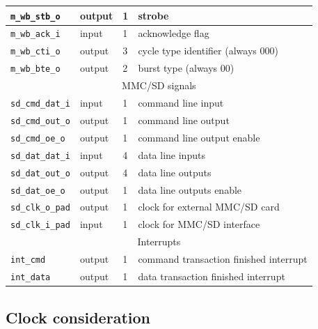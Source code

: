 \begin{table}
\begin{center}
\begin{tabular}{l|l|l|l}
                    \texttt{m\_wb\_stb\_o} & output & 1 & strobe \\ \hline
                    \texttt{m\_wb\_ack\_i} & input & 1 & acknowledge flag \\ \hline
                    \texttt{m\_wb\_cti\_o} & output & 3 & cycle type identifier (always 000) \\ \hline
                    \texttt{m\_wb\_bte\_o} & output & 2 & burst type (always 00) \\ \hline
                    \multicolumn{4}{c}{MMC/SD signals} \\ \hline
                    \texttt{sd\_cmd\_dat\_i} & input & 1 & command line input \\ \hline
                    \texttt{sd\_cmd\_out\_o} & output & 1 & command line output \\ \hline
                    \texttt{sd\_cmd\_oe\_o} & output & 1 & command line output enable \\ \hline
                    \texttt{sd\_dat\_dat\_i} & input & 4 & data line inputs \\ \hline
                    \texttt{sd\_dat\_out\_o} & output & 4 & data line outputs \\ \hline
                    \texttt{sd\_dat\_oe\_o} & output & 1 & data line outputs enable \\ \hline
                    \texttt{sd\_clk\_o\_pad} & output & 1 & clock for external MMC/SD card \\ \hline
                    \texttt{sd\_clk\_i\_pad} & input & 1 & clock for MMC/SD interface \\ \hline
                    \multicolumn{4}{c}{Interrupts} \\ \hline
                    \texttt{int\_cmd} & output & 1 & command transaction finished interrupt \\ \hline
                    \texttt{int\_data} & output & 1 & data transaction finished interrupt \\ \hline
                    \hline
            \end{tabular}
            \label{tab:singals}
        \end{center}
    \end{table}     
    
    \subsection{Clock consideration}
    \label{sec:clock}
    

